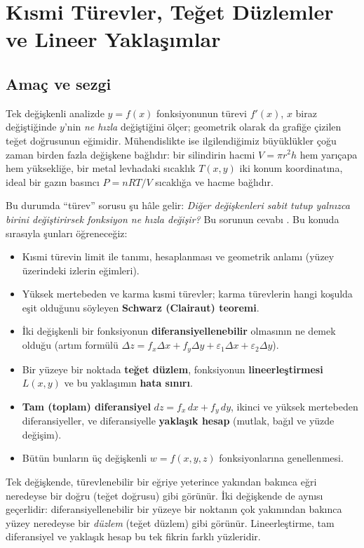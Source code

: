 \section{Kısmi Türevler, Teğet Düzlemler ve Lineer Yaklaşımlar}

\subsection{Amaç ve sezgi}

Tek değişkenli analizde $y=f(x)$ fonksiyonunun türevi $f'(x)$, $x$ biraz değiştiğinde $y$'nin \emph{ne hızla} değiştiğini
ölçer; geometrik olarak da grafiğe çizilen teğet doğrusunun eğimidir. Mühendislikte ise ilgilendiğimiz büyüklükler çoğu
zaman birden fazla değişkene bağlıdır: bir silindirin hacmi $V=\pi r^2h$ hem yarıçapa hem yüksekliğe, bir metal levhadaki
sıcaklık $T(x,y)$ iki konum koordinatına, ideal bir gazın basıncı $P=nRT/V$ sıcaklığa ve hacme bağlıdır.

Bu durumda ``türev'' sorusu şu hâle gelir: \emph{Diğer değişkenleri sabit tutup yalnızca birini değiştirirsek fonksiyon
ne hızla değişir?} Bu sorunun cevabı . Bu konuda sırasıyla şunları öğreneceğiz:
\begin{itemize}
  \item Kısmi türevin limit ile tanımı, hesaplanması ve geometrik anlamı (yüzey üzerindeki izlerin eğimleri).
  \item Yüksek mertebeden ve karma kısmi türevler; karma türevlerin hangi koşulda eşit olduğunu söyleyen
        \textbf{Schwarz (Clairaut) teoremi}.
  \item İki değişkenli bir fonksiyonun \textbf{diferansiyellenebilir} olmasının ne demek olduğu (artım formülü
        $\Delta z=f_x\Delta x+f_y\Delta y+\varepsilon_1\Delta x+\varepsilon_2\Delta y$).
  \item Bir yüzeye bir noktada \textbf{teğet düzlem}, fonksiyonun \textbf{lineerleştirmesi} $L(x,y)$ ve bu yaklaşımın
        \textbf{hata sınırı}.
  \item \textbf{Tam (toplam) diferansiyel} $dz=f_x\,dx+f_y\,dy$, ikinci ve yüksek mertebeden diferansiyeller, ve
        diferansiyelle \textbf{yaklaşık hesap} (mutlak, bağıl ve yüzde değişim).
  \item Bütün bunların üç değişkenli $w=f(x,y,z)$ fonksiyonlarına genellenmesi.
\end{itemize}

\begin{bilgi}
Tek değişkende, türevlenebilir bir eğriye yeterince yakından bakınca eğri neredeyse bir doğru (teğet doğrusu) gibi
görünür. İki değişkende de aynısı geçerlidir: diferansiyellenebilir bir yüzeye bir noktanın çok yakınından bakınca yüzey
neredeyse bir \emph{düzlem} (teğet düzlem) gibi görünür. Lineerleştirme, tam diferansiyel ve yaklaşık hesap bu tek fikrin
farklı yüzleridir.
\end{bilgi}

